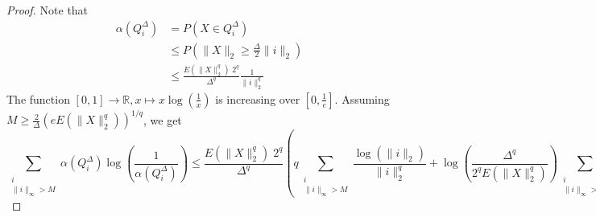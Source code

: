 \documentclass[12pt]{report}
\theoremstyle{definition}
\theoremstyle{remark}
\begin{document}
\begin{proof}
	Note that 
$$\begin{aligned}
\alpha(Q_i^\Delta) &= P(X\in Q_i^\Delta)\\ &\leq P(\|X\|_2\geq \frac{\Delta}{2} \|i\|_2)\\
&\leq \frac{E(\|X\|_2^q)\; 2^q}{\Delta^q}\frac{1}{\|i\|_2^q}
\end{aligned}
$$
The function $[0,1]\to \mathbb R, x\mapsto x\log\left(\frac{1}{x}\right)$ is increasing over $[0,\frac 1e]$. Assuming $\displaystyle M\geq \frac{2}{\Delta}\left(eE(\|X\|_2^q) \right)^{1/q}$, we get 
\begin{equation}
\sum_{\substack{i\\ \|i\|_\infty > M}} \alpha(Q_i^\Delta)\log\left(\frac{1}{\alpha(Q_i^\Delta)}\right)
\leq\frac{E(\|X\|_2^q)\; 2^q}{\Delta^q}\left(q \sum_{\substack{i\\ \|i\|_\infty > M}} \frac{\log(\|i\|_2)}{\|i\|_2^q} + \log\left(\frac{\Delta^q}{2^qE(\|X\|_2^q)} \right)\sum_{\substack{i\\ \|i\|_\infty > M}} \frac{1}{\|i\|_2^q} \right) \tag{5} \label{5}
\end{equation}


\end{proof}
\end{document}
